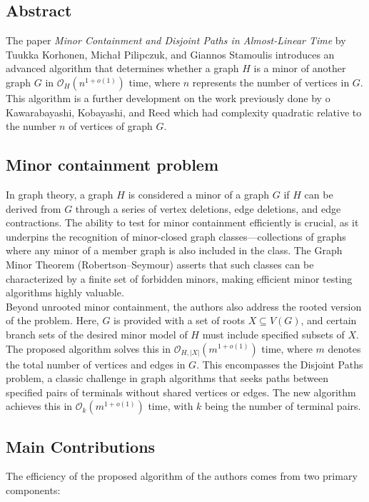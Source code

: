 
\subsection{Abstract}
The paper \textit{Minor Containment and Disjoint Paths in Almost-Linear Time} by Tuukka Korhonen, Michał Pilipczuk, and Giannos Stamoulis introduces an advanced algorithm that determines whether a graph $H$ is a minor of another graph $G$ in 
$\mathcal{O}_H(n^{1+o(1)})$ time, where $n$ represents the number of vertices in $G$. This algorithm is a further development on the work previously done by o Kawarabayashi, Kobayashi, and Reed which had complexity quadratic relative to the number $n$ of vertices of graph $G$.

\subsection{Minor containment problem}
In graph theory, a graph $H$ is considered a minor of a graph 
$G$ if $H$ can be derived from $G$ through a series of vertex deletions, edge deletions, and edge contractions. The ability to test for minor containment efficiently is crucial, as it underpins the recognition of minor-closed graph classes—collections of graphs where any minor of a member graph is also included in the class. The Graph Minor Theorem (Robertson–Seymour) asserts that such classes can be characterized by a finite set of forbidden minors, making efficient minor testing algorithms highly valuable.
\\

Beyond unrooted minor containment, the authors also address the rooted version of the problem. Here, $G$ is provided with a set of roots $X\subseteq V(G)$, and certain branch sets of the desired minor model of
$H$ must include specified subsets of $X$. The proposed algorithm solves this in $\mathcal{O}_{H,|X|}(m^{1+o(1)})$ time, where $m$ denotes the total number of vertices and edges in $G$. This encompasses the Disjoint Paths problem, a classic challenge in graph algorithms that seeks paths between specified pairs of terminals without shared vertices or edges. The new algorithm achieves this in $\mathcal{O}_k(m^{1+o(1)})$ time, with $k$ being the number of terminal pairs. 

\subsection{Main Contributions}
The efficiency of the proposed algorithm of the authors comes from two primary components:

